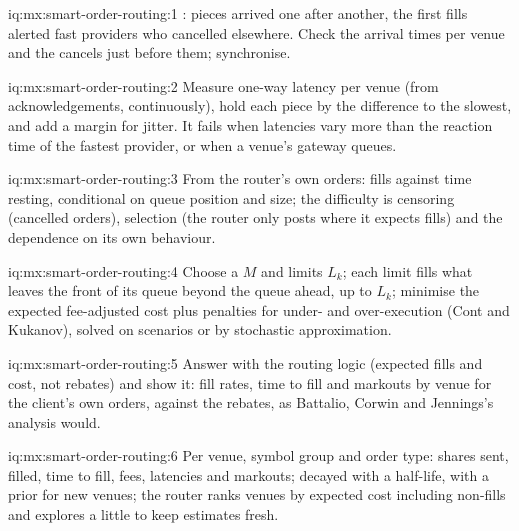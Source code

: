 \begin{solution}{iq:mx:smart-order-routing:1}
: pieces arrived one after another, the first fills alerted fast providers who cancelled elsewhere. Check the arrival times per venue and
the cancels just before them; synchronise.
\end{solution}

\begin{solution}{iq:mx:smart-order-routing:2}
Measure one-way latency per venue (from acknowledgements, continuously), hold each piece by the difference to the slowest, and add a margin for jitter.
It fails when latencies vary more than the reaction time of the fastest provider, or when a venue's gateway queues.
\end{solution}

\begin{solution}{iq:mx:smart-order-routing:3}
From the router's own orders: fills against time resting, conditional on queue position and size; the difficulty is censoring (cancelled orders),
selection (the router only posts where it expects fills) and the dependence on its own behaviour.
\end{solution}

\begin{solution}{iq:mx:smart-order-routing:4}
Choose a  $M$ and limits $L_k$; each limit fills what leaves the front of its queue beyond the queue ahead, up to $L_k$; minimise the
expected fee-adjusted cost plus penalties for under- and over-execution (Cont and Kukanov), solved on scenarios or by stochastic approximation.
\end{solution}

\begin{solution}{iq:mx:smart-order-routing:5}
Answer with the routing logic (expected fills and cost, not rebates) and show it: fill rates, time to fill and markouts by venue for the client's own
orders, against the rebates, as Battalio, Corwin and Jennings's analysis would.
\end{solution}

\begin{solution}{iq:mx:smart-order-routing:6}
Per venue, symbol group and order type: shares sent, filled, time to fill, fees, latencies and markouts; decayed with a half-life, with a prior for
new venues; the router ranks venues by expected cost including non-fills and explores a little to keep estimates fresh.
\end{solution}

